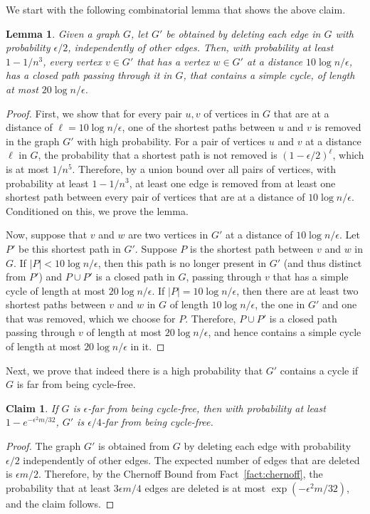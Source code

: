 \documentclass[11pt]{article}
\newtheorem{lemma}[theorem]{Lemma}
\newtheorem{claim}[theorem]{Claim}
\begin{document}
We start with the following combinatorial lemma that shows the above claim.


\begin{lemma}
  Given a graph $G$, let $G'$ be obtained by deleting each edge in $G$ with probability
  $\epsilon/2$, independently of other edges. Then, with probability at least $1-1/n^3$, every vertex $v\in
  G'$ that has a vertex $w\in G'$ at a distance $10\log n/\epsilon$, has a closed path passing
  through it in $G$, that contains a simple cycle, of length at most $20\log n/\epsilon$.
  \label{lem:main}
\end{lemma}

\begin{proof}
  First, we show that for every pair $u,v$ of vertices in $G$ that are at a distance of $\ell = 10\log
  n/\epsilon$, one of the shortest paths between $u$ and $v$ is removed in the graph $G'$ with high
  probability. For a pair of vertices $u$ and $v$ at a distance $\ell$ in $G$, the probability that a
  shortest path is not removed is $(1-\epsilon/2)^{\ell}$, which is at most $1/n^5$. Therefore, by a union
  bound over all pairs of vertices, with probability at least $1-1/n^3$, at least one edge is
  removed from at least one shortest path between every pair of vertices that are at a distance of
  $10\log n/\epsilon$. Conditioned on this, we prove the lemma.

  Now, suppose that $v$ and $w$ are two vertices in $G'$ at a distance of $10\log n/\epsilon$. Let
  $P'$ be this shortest path in $G'$. Suppose $P$ is the shortest path between $v$ and $w$ in $G$.
  If $|P|<10\log n/\epsilon$, then this path is no longer present in $G'$ (and thus distinct from
  $P'$) and $P\cup P'$ is a closed path in $G$, passing through $v$ that has a simple cycle of
  length at most $20\log n/\epsilon$. If $|P|=10\log n/\epsilon$, then there are at least two
  shortest paths between $v$ and $w$ in $G$ of length $10\log n/\epsilon$, the one in $G'$ and one
  that was removed, which we choose for $P$. Therefore, $P\cup P'$ is a closed path passing through
  $v$ of length at most $20\log n/\epsilon$, and hence contains a simple cycle of length at most
  $20\log n/\epsilon$ in it.
\end{proof}

Next, we prove that indeed there is a high probability that $G'$ contains a cycle if $G$ is far from being cycle-free.
\begin{claim}
  If $G$ is $\epsilon$-far from being cycle-free, then with probability at least $1 - e^{-\epsilon^2
  m/32}$, $G'$ is $\epsilon/4$-far from being cycle-free.
  \label{obs:distance}
\end{claim}
\begin{proof}
  The graph $G'$ is obtained from $G$ by deleting each edge with probability $\epsilon/2$
  independently of other edges. The expected number of edges that are deleted is $\epsilon m/2$.
  Therefore, by the Chernoff Bound from Fact~\ref{fact:chernoff}, the probability that at least $3\epsilon m/4$ edges are
  deleted is at most $\exp(-\epsilon^2 m/32)$, and the claim follows.
\end{proof}
\end{document}
